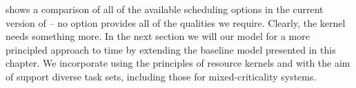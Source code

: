 shows a comparison of all of the available scheduling options in the current version of \selfour -- no option provides all of the qualities we require.
Clearly, the kernel needs something more. 
In the next section we will our model for a more principled approach to time by extending the
baseline \selfour model presented in this chapter. We incorporate using the principles of resource kernels and with the aim of support diverse task sets, including those for mixed-criticality systems.

